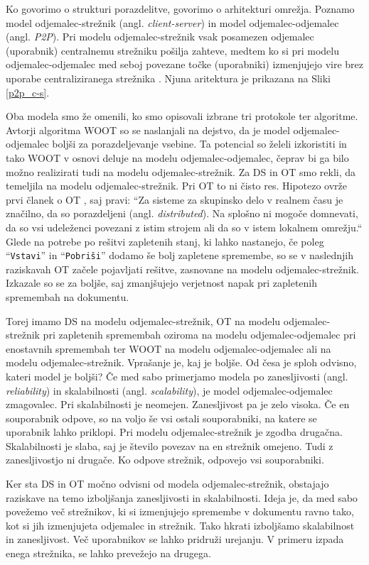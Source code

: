 \documentclass[a4paper, 12pt, twoside]{book}
\begin{document}
Ko govorimo o strukturi porazdelitve, govorimo o arhitekturi omrežja. Poznamo model odjemalec-strežnik (angl. \textit{client-server}) in model odjemalec-odjemalec (angl. \textit{P2P}). Pri modelu odjemalec-strežnik vsak posamezen odjemalec (uporabnik) centralnemu strežniku pošilja zahteve, medtem ko si pri modelu odjemalec-odjemalec med seboj povezane točke (uporabniki) izmenjujejo vire brez uporabe centraliziranega strežnika \cite{p2p, c-s}. Njuna aritektura je prikazana na Sliki \ref{p2p_c-s}.

Oba modela smo že omenili, ko smo opisovali izbrane tri protokole ter algoritme. Avtorji algoritma WOOT so se naslanjali na dejstvo, da je model odjemalec-odjemalec boljši za porazdeljevanje vsebine. Ta potencial so želeli izkoristiti in tako WOOT v osnovi deluje na modelu odjemalec-odjemalec, čeprav bi ga bilo možno realizirati tudi na modelu odjemalec-strežnik. Za DS in OT smo rekli, da temeljila na modelu odjemalec-strežnik. Pri OT to ni čisto res. Hipotezo ovrže prvi članek o OT \cite{ccigs}, saj pravi: “Za sisteme za skupinsko delo v realnem času je značilno, da so porazdeljeni (angl. \textit{distributed}). Na splošno ni mogoče domnevati, da so vsi udeleženci povezani z istim strojem ali da so v istem lokalnem omrežju.“ Glede na potrebe po rešitvi zapletenih stanj, ki lahko nastanejo, če poleg “{\tt Vstavi}” in “{\tt Pobriši}” dodamo še bolj zapletene spremembe, so se v naslednjih raziskavah OT \cite{hllbw} začele pojavljati rešitve, zasnovane na modelu odjemalec-strežnik. Izkazale so se za boljše, saj zmanjšujejo verjetnost napak pri zapletenih spremembah na dokumentu.

Torej imamo DS na modelu odjemalec-strežnik, OT na modelu odjemalec-strežnik pri zapletenih spremembah oziroma na modelu odjemalec-odjemalec pri enostavnih spremembah ter WOOT na modelu odjemalec-odjemalec ali na modelu odjemalec-strežnik. Vprašanje je, kaj je boljše. Od česa je sploh odvisno, kateri model je boljši? Če med sabo primerjamo modela po zanesljivosti (angl. \textit{reliability}) in skalabilnosti (angl. \textit{scalability}), je model odjemalec-odjemalec zmagovalec. Pri skalabilnosti je neomejen. Zanesljivost pa je zelo visoka. Če en souporabnik odpove, so na voljo še vsi ostali souporabniki, na katere se uporabnik lahko priklopi. Pri modelu odjemalec-strežnik je zgodba drugačna. Skalabilnosti je slaba, saj je število povezav na en strežnik omejeno. Tudi z zanesljivostjo ni drugače. Ko odpove strežnik, odpovejo vsi souporabniki.

Ker sta DS in OT močno odvisni od modela odjemalec-strežnik, obstajajo raziskave \cite{diffsync} na temo izboljšanja zanesljivosti in skalabilnosti. Ideja je, da med sabo povežemo več strežnikov, ki si izmenjujejo spremembe v dokumentu ravno tako, kot si jih izmenjujeta odjemalec in strežnik. Tako hkrati izboljšamo skalabilnost in zanesljivost. Več uporabnikov se lahko pridruži urejanju. V primeru izpada enega strežnika, se lahko prevežejo na drugega.
\end{document}
